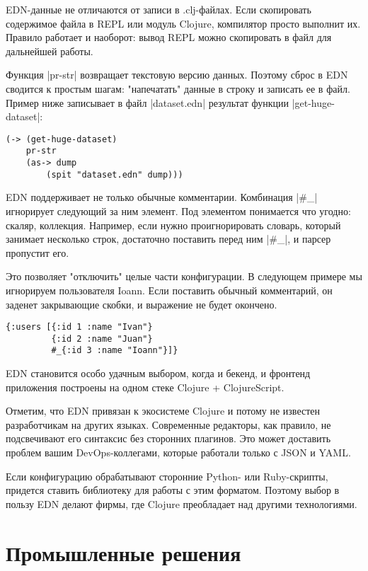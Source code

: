 EDN-данные не отличаются от записи в .clj-файлах. Если скопировать содержимое
файла в REPL или модуль Clojure, компилятор просто выполнит их. Правило работает
и наоборот: вывод REPL можно скопировать в файл для дальнейшей работы.

Функция \spverb|pr-str| возвращает текстовую версию данных. Поэтому сброс в EDN
сводится к простым шагам: "напечатать" данные в строку и записать ее в
файл. Пример ниже записывает в файл \spverb|dataset.edn| результат функции
\spverb|get-huge-dataset|:

\begin{verbatim}
(-> (get-huge-dataset)
    pr-str
    (as-> dump
        (spit "dataset.edn" dump)))
\end{verbatim}

EDN поддерживает не только обычные комментарии. Комбинация \spverb|#_| игнорирует
следующий за ним элемент. Под элементом понимается что угодно: скаляр,
коллекция. Например, если нужно проигнорировать словарь, который занимает
несколько строк, достаточно поставить перед ним \spverb|#_|, и парсер пропустит
его.

Это позволяет "отключить" целые части конфигурации. В следующем примере мы
игнорируем пользователя Ioann. Если поставить обычный комментарий, он заденет
закрывающие скобки, и выражение не будет окончено.

\begin{verbatim}
{:users [{:id 1 :name "Ivan"}
         {:id 2 :name "Juan"}
         #_{:id 3 :name "Ioann"}]}
\end{verbatim}

EDN становится особо удачным выбором, когда и бекенд, и фронтенд приложения
построены на одном стеке Clojure + ClojureScript.

Отметим, что EDN привязан к экосистеме Clojure и потому не известен
разработчикам на других языках. Современные редакторы, как правило, не
подсвечивают его синтаксис без сторонних плагинов. Это может доставить проблем
вашим DevOps-коллегами, которые работали только с JSON и YAML.

Если конфигурацию обрабатывают сторонние Python- или Ruby-скрипты, придется
ставить библиотеку для работы с этим форматом. Поэтому выбор в пользу EDN делают
фирмы, где Clojure преобладает над другими технологиями.

\section{Промышленные решения}

